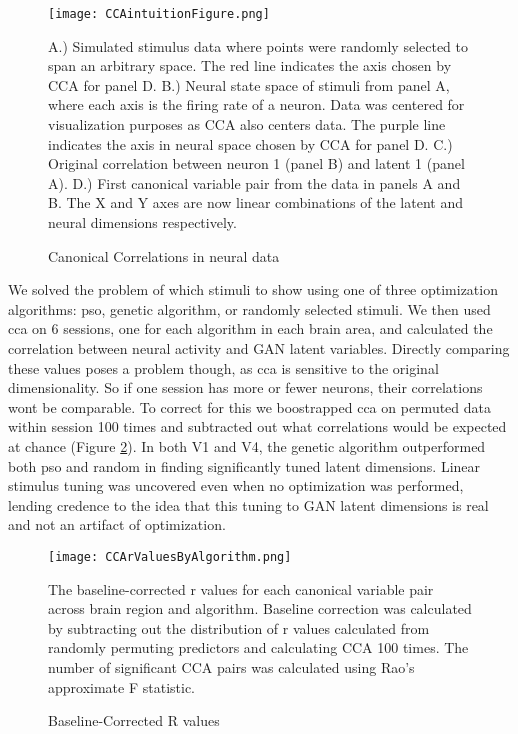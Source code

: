 \begin{figure}
	\centering
	\texttt{[image: CCAintuitionFigure.png]}
	\caption{Canonical Correlations in neural data}{A.) Simulated stimulus data where points were randomly selected to span an arbitrary space. The red line indicates the axis chosen by CCA for panel D. B.) Neural state space of stimuli from panel A, where each axis is the firing rate of a neuron. Data was centered for visualization purposes as CCA also centers data. The purple line indicates the axis in neural space chosen by CCA for panel D. C.) Original correlation between neuron 1 (panel B) and latent 1 (panel A). D.) First canonical variable pair from the data in panels A and B. The X and Y axes are now linear combinations of the latent and neural dimensions respectively. }
	\label{fig:ccaIntuition}
\end{figure}

We solved the problem of which stimuli to show using one of three optimization algorithms: \gls{pso}, genetic algorithm, or randomly selected stimuli. We then used \gls{cca} on 6 sessions, one for each algorithm in each brain area, and calculated the correlation between neural activity and GAN latent variables. Directly comparing these values poses a problem though, as \gls{cca} is sensitive to the original dimensionality. So if one session has more or fewer neurons, their correlations wont be comparable. To correct for this we boostrapped \gls{cca} on permuted data within session 100 times and subtracted out what correlations would be expected at chance (Figure \ref{fig:ccaR}). In both V1 and V4, the genetic algorithm outperformed both \gls{pso} and random in finding significantly tuned latent dimensions. Linear stimulus tuning was uncovered even when no optimization was performed, lending credence to the idea that this tuning to GAN latent dimensions is real and not an artifact of optimization.

\begin{figure}
	\centering
	\texttt{[image: CCArValuesByAlgorithm.png]}
	\caption{Baseline-Corrected R values}{The baseline-corrected r values for each canonical variable pair across brain region and algorithm. Baseline correction was calculated by subtracting out the distribution of r values calculated from randomly permuting predictors and calculating CCA 100 times. The number of significant CCA pairs was calculated using Rao's approximate F statistic.}
	\label{fig:ccaR}
\end{figure}

